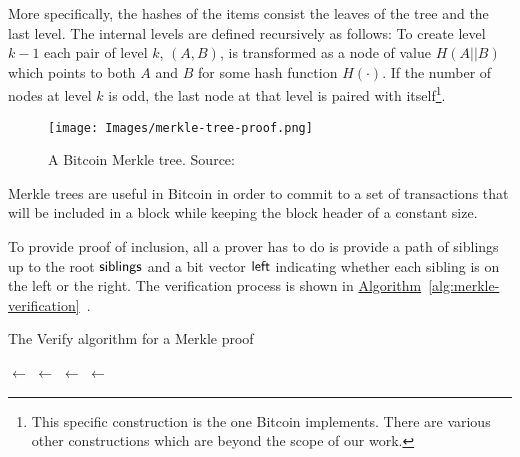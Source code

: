 More specifically, the hashes of the items consist the leaves of the tree and the last level. The internal levels are defined recursively as follows: To create level $k-1$ each pair of level $k$, $(A, B)$, is transformed as a node of value $H(A || B)$ which points to both $A$ and $B$ for some hash function $H(\cdot)$. If the number of nodes at level $k$ is odd, the last node at that level is paired with itself\footnote{This specific construction is the one Bitcoin implements. There are various other constructions which are beyond the scope of our work.}.
\vspace{0.3cm}
\begin{figure}[H]
  \centering
  \texttt{[image: Images/merkle-tree-proof.png]}
  \caption{A Bitcoin Merkle tree. Source:~\cite{mastering}}
  \label{fig:merkletree}
\end{figure}
\vspace{0.3cm}

Merkle trees are useful in Bitcoin in order to commit to a set of transactions that will be included in a block while keeping the block header of a constant size.

To provide proof of inclusion, all a prover has to do is provide a path of siblings up to the root $\sf{siblings}$ and a bit vector $\sf{left}$ indicating whether each sibling is on the left or the right. The verification process is shown in \hyperref[alg:merkle-verification]{Algorithm}~\ref{alg:merkle-verification}~\cite{gtklocker}.
\vspace{0.3cm}
\begin{algorithm}
  \caption{\label{alg:merkle-verification}The \textsf{Verify} algorithm
    for a Merkle proof}
    \begin{algorithmic}[1]
            \State {} $\gets$ 
              \State {} $\gets$ 
                \State {} $\gets$ 
              \Else
                \State {} $\gets$ 
              \EndIf
            \EndWhile
            \State{}
        \EndFunction
    \end{algorithmic}
\end{algorithm}
\vspace{0.3cm}

